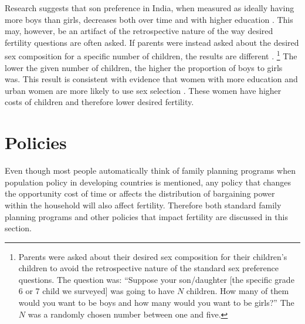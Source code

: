\documentclass[letterpaper,12pt]{article}
\begin{document}
Research suggests that son preference in India, when measured as ideally
having more boys than girls, decreases both over time and with higher
education \citep{bhat03,pande07}. 
This may, however, be an artifact of the retrospective nature of the way
desired fertility questions are often asked. 
If parents were instead asked about the desired sex composition for a
specific number of children, the results are different
\citep{Jayachandran2017}.%
\footnote{
Parents were asked about their desired sex composition for their
children's children to avoid the retrospective nature of the standard
sex preference questions. 
The question was: ``Suppose your son/daughter [the specific grade 6 or
7 child we surveyed]
was going to have $N$ children. 
How many of them would you want to be boys and how many would you want
to be girls?'' The $N$ was a randomly chosen number between one and
five.} 
The lower the given number of children, the higher the proportion of
boys to girls was. 
This result is consistent with evidence that women with more education
and urban women are more likely to use sex selection
\citep{Portner2015b}. 
These women have higher costs of children and therefore lower desired
fertility.

\section{Policies}\label{policies}

Even though most people automatically think of family planning programs
when population policy in developing countries is mentioned, any policy
that changes the opportunity cost of time or affects the distribution of
bargaining power within the household will also affect fertility. 
Therefore both standard family planning programs and other policies that
impact fertility are discussed in this section.
\end{document}
